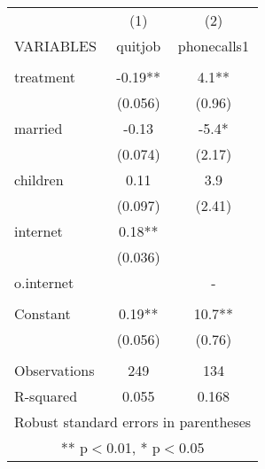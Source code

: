 \documentclass[]{article}
\begin{document}
\begin{tabular}{lcc} \hline
 & (1) & (2) \\
VARIABLES & quitjob & phonecalls1 \\ \hline
 &  &  \\
treatment & -0.19** & 4.1** \\
 & (0.056) & (0.96) \\
married & -0.13 & -5.4* \\
 & (0.074) & (2.17) \\
children & 0.11 & 3.9 \\
 & (0.097) & (2.41) \\
internet & 0.18** &  \\
 & (0.036) &  \\
o.internet &  & - \\
 &  &  \\
Constant & 0.19** & 10.7** \\
 & (0.056) & (0.76) \\
 &  &  \\
Observations & 249 & 134 \\
 R-squared & 0.055 & 0.168 \\ \hline
\multicolumn{3}{c}{ Robust standard errors in parentheses} \\
\multicolumn{3}{c}{ ** p$<$0.01, * p$<$0.05} \\
\end{tabular}
\end{document}
